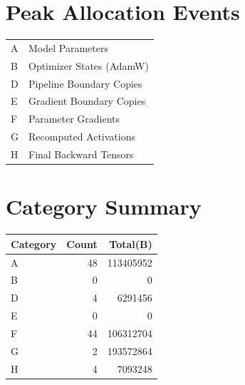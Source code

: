 \documentclass{article}
\begin{document}
\section*{Peak Allocation Events}
\small
\begin{tabular}{ll}
A & Model Parameters \\
B & Optimizer States (AdamW) \\
D & Pipeline Boundary Copies \\
E & Gradient Boundary Copies \\
F & Parameter Gradients \\
G & Recomputed Activations \\
H & Final Backward Tensors \\
\end{tabular}
\vspace{0.5em}
\section*{Category Summary}
\begin{tabular}{l r r}
Category & Count & Total(B) \\
\hline
A & 48 & 113405952 \\
B & 0 & 0 \\
D & 4 & 6291456 \\
E & 0 & 0 \\
F & 44 & 106312704 \\
G & 2 & 193572864 \\
H & 4 & 7093248 \\
\end{tabular}
\vspace{0.5em}
\end{document}
